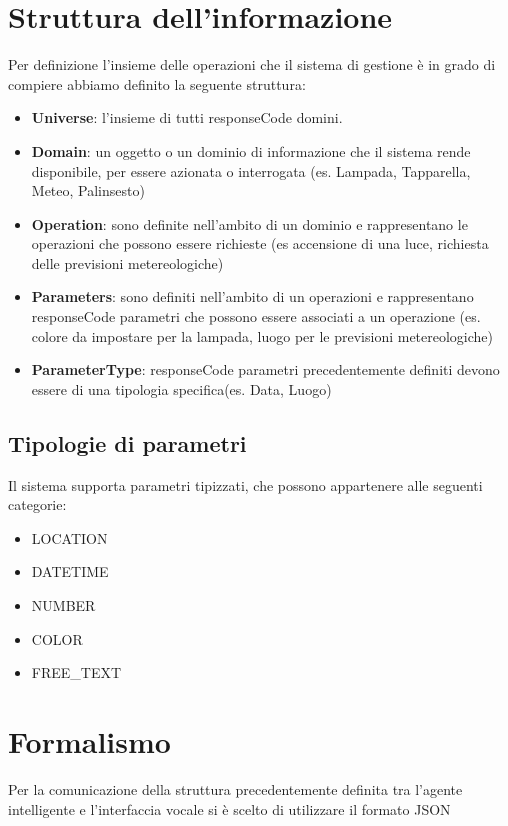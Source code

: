 \documentclass[twoside]{supsistudent}
\begin{document}
\section{Struttura dell'informazione}
Per definizione l'insieme delle operazioni che il sistema di gestione è in grado di compiere abbiamo definito la seguente struttura:
\begin{itemize}
	\item \textbf{Universe}: l'insieme di tutti responseCode domini.
	\item \textbf{Domain}: un oggetto o un dominio di informazione che il sistema rende disponibile, per essere azionata o interrogata (es. Lampada, Tapparella, Meteo, Palinsesto)
	\item \textbf{Operation}: sono definite nell'ambito di un dominio e rappresentano le operazioni che possono essere richieste (es accensione di una luce, richiesta delle previsioni metereologiche)
	\item \textbf{Parameters}: sono definiti nell'ambito di un operazioni e rappresentano responseCode parametri che possono essere associati a un operazione (es. colore da impostare per la lampada, luogo per le previsioni metereologiche)
	\item \textbf{ParameterType}: responseCode parametri precedentemente definiti devono essere di una tipologia specifica(es. Data, Luogo)
\end{itemize}
\subsection{Tipologie di parametri}
Il sistema supporta parametri tipizzati, che possono appartenere alle seguenti categorie:
\begin{itemize}
	\item LOCATION
	\item DATETIME
	\item NUMBER
	\item COLOR
	\item FREE\_TEXT
\end{itemize}
\section{Formalismo}
Per la comunicazione della struttura precedentemente definita tra l'agente intelligente e l'interfaccia vocale si è scelto di utilizzare il formato JSON
\end{document}
